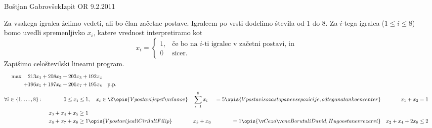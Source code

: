 \begin{naloga}{Boštjan Gabrovšek}{Izpit OR 9.2.2011}
\begin{odgovor}
Za vsakega igralca želimo vedeti, ali bo član začetne postave. Igralcem po vrsti
dodelimo števila od 1 do 8.
Za $i$-tega igralca ($1 \le i \le 8$) bomo uvedli spremenljivko $x_{i}$,
katere vrednost interpretiramo kot
$$
x_{i} = \begin{cases}
1, & \text{če bo na $i$-ti igralec v začetni postavi, in} \\
0  & \text{sicer.}
\end{cases}
$$
Zapišimo celoštevilski linearni program.
\begin{alignat*}{2}
\shortintertext{
$\quad \begin{alignedat}{3}
\max \quad 213x_1 &+ 208x_2 &&+ 203x_3 &&+ 192x_4 \\
     + 196x_5 &+ 197x_6 &&+ 200x_7 &&+ 195x_8
\quad \text{p.p.}
\end{alignedat}$}
\forall i \in \{1, \dots, 8\}: &\ &
0 \le x_i &\le 1, \quad x_i \in \Z
\opis{V postavi je pet članov}
&& \sum_{i=1}^8 x_i &= 5
\opis{V postavi so zastopane vse pozicije, od tega natanko en center}
&& x_1 + x_2 &= 1 \\
&& x_3 + x_4 + x_5 &\ge 1 \\
&& x_6 + x_7 + x_8 &\ge 1
\opis{V postavi je ali Ciril ali Filip}
&& x_3 + x_6 &= 1
\opis{Če začne Borut ali David, Hugo ostane v rezervi}
&& x_2 + x_4 + 2x_8 &\leq 2
\end{alignat*}
\end{odgovor}
\end{naloga}
